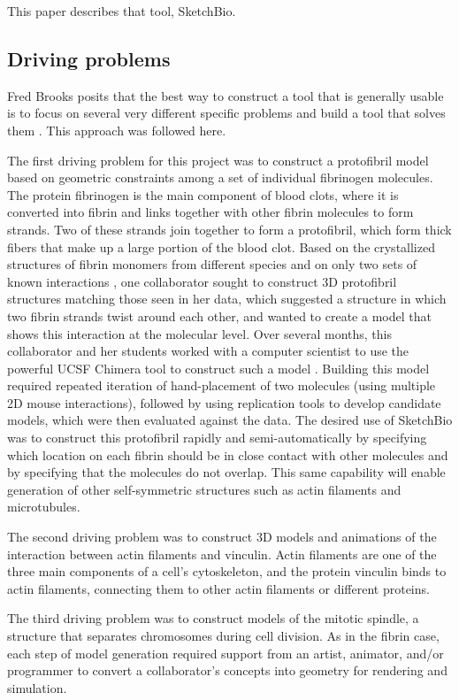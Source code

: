 \documentclass[twocolumn]{bmcart}%
\begin{document}
This paper describes that tool, SketchBio.

\subsection*{Driving problems}
Fred Brooks posits that the best way to construct a tool that is generally usable is to focus on several very different specific problems and build a tool that solves them \cite{Brooks}.
This approach was followed here.

The first driving problem for this project was to construct a protofibril model based on geometric constraints among a set of individual fibrinogen molecules.
The protein fibrinogen is the main component of blood clots, where it is converted into fibrin and links together with other fibrin molecules to form strands.
Two of these strands join together to form a protofibril, which form thick fibers that make up a large portion of the blood clot.
Based on the crystallized structures of fibrin monomers from different species and on only two sets of known interactions \cite{lord2007fibrinogen}, one collaborator sought to construct 3D protofibril structures matching those seen in her data, which suggested a structure in which two fibrin strands twist around each other, and wanted to create a model that shows this interaction at the molecular level.
Over several months, this collaborator and her students worked with a computer scientist to use the powerful UCSF Chimera tool to construct such a model \cite{lordSubmitted}.
Building this model required repeated iteration of hand-placement of two molecules (using multiple 2D mouse interactions), followed by using replication tools to develop candidate models, which were then evaluated against the data.
The desired use of SketchBio was to construct this protofibril rapidly and semi-automatically by specifying which location on each fibrin should be in close contact with other molecules and by specifying that the molecules do not overlap.
This same capability will enable generation of other self-symmetric structures such as actin filaments and microtubules.

The second driving problem was to construct 3D models and animations of the interaction between actin filaments and vinculin.
Actin filaments are one of the three main components of a cell's cytoskeleton, and the protein vinculin binds to actin filaments, connecting them to other actin filaments or different proteins.

The third driving problem was to construct models of the mitotic spindle, a structure that separates chromosomes during cell division.
As in the fibrin case, each step of model generation required support from an artist, animator, and/or programmer to convert a collaborator's concepts into geometry for rendering and simulation.
\end{document}
